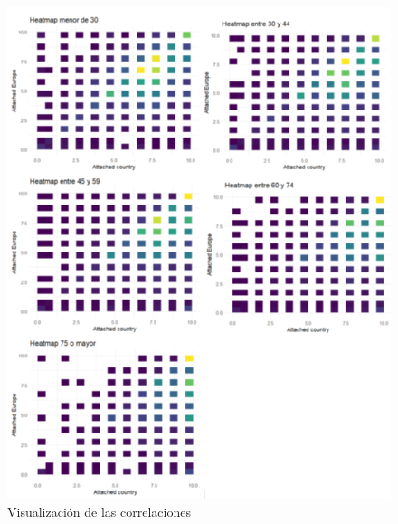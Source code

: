 \documentclass{article}
\begin{document}
 \begin{figure}[H]
 \centering
 \includegraphics[width=1\textwidth]{Imatge2.png}
 \caption{Visualización de las correlaciones}
 \end{figure}
\end{document}
